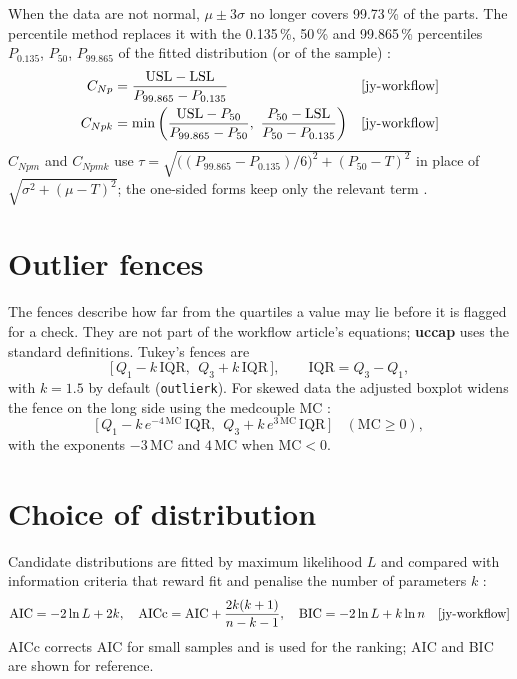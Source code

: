 \documentclass[a4paper,11pt,oneside,openany,parskip=half-,headings=standardclasses,toc=flat,numbers=noenddot]{scrbook}
\newcommand{\code}[1]{\texttt{\begingroup\def\_{\textunderscore\allowbreak}#1\endgroup}}
\newcommand{\pkg}{\textsf{\bfseries uccap}}
\begin{document}
When the data are not normal, $\mu \pm 3\sigma$ no longer covers 99.73\,\% of the parts. The percentile method
replaces it with the 0.135\,\%, 50\,\% and 99.865\,\% percentiles $P_{0.135}$, $P_{50}$, $P_{99.865}$ of the fitted
distribution (or of the sample) \cite{clements}:
\begin{align}
C_{Np} &= \frac{\mathrm{USL}-\mathrm{LSL}}{P_{99.865}-P_{0.135}} && \text{\cite[Eq.~(18)]{jy-workflow}}\label{eq:cnp}\\
C_{Npk} &= \min\left(\frac{\mathrm{USL}-P_{50}}{P_{99.865}-P_{50}},\ \frac{P_{50}-\mathrm{LSL}}{P_{50}-P_{0.135}}\right) && \text{\cite[Eq.~(19)]{jy-workflow}}\label{eq:cnpk}
\end{align}
$C_{Npm}$ and $C_{Npmk}$ \cite[Eqs.~(20), (21)]{jy-workflow} use
$\tau = \sqrt{\bigl((P_{99.865}-P_{0.135})/6\bigr)^2 + (P_{50}-T)^2}$ in place of $\sqrt{\sigma^2+(\mu-T)^2}$; the
one-sided forms keep only the relevant term \cite[Eqs.~(22)--(27)]{jy-workflow}.

\section{Outlier fences}\label{app:f-outliers}

The fences describe how far from the quartiles a value may lie before it is flagged for a check. They are not part
of the workflow article's equations; \pkg{} uses the standard definitions. Tukey's fences \cite{tukey} are
\begin{equation}\label{eq:tukey}
\bigl[\,Q_1 - k\,\mathrm{IQR},\ \ Q_3 + k\,\mathrm{IQR}\,\bigr], \qquad \mathrm{IQR} = Q_3 - Q_1,
\end{equation}
with $k = 1.5$ by default (\code{outlier\_k}). For skewed data the adjusted boxplot \cite{hubert} widens the fence on
the long side using the medcouple MC \cite{brys}:
\begin{equation}\label{eq:adjbox}
\bigl[\,Q_1 - k\,e^{-4\,\mathrm{MC}}\,\mathrm{IQR},\ \ Q_3 + k\,e^{3\,\mathrm{MC}}\,\mathrm{IQR}\,\bigr] \quad (\mathrm{MC} \ge 0),
\end{equation}
with the exponents $-3\,\mathrm{MC}$ and $4\,\mathrm{MC}$ when $\mathrm{MC} < 0$.

\section{Choice of distribution}\label{app:f-aicc}

Candidate distributions are fitted by maximum likelihood $L$ and compared with information criteria that reward fit
and penalise the number of parameters $k$ \cite{burnham}:
\begin{equation}\label{eq:aicc}
\mathrm{AIC} = -2\ln L + 2k, \quad
\mathrm{AICc} = \mathrm{AIC} + \frac{2k(k+1)}{n-k-1}, \quad
\mathrm{BIC} = -2\ln L + k\ln n \quad \text{\cite[Eq.~(1)]{jy-workflow}}
\end{equation}
AICc corrects AIC for small samples and is used for the ranking; AIC and BIC are shown for reference.
\end{document}
